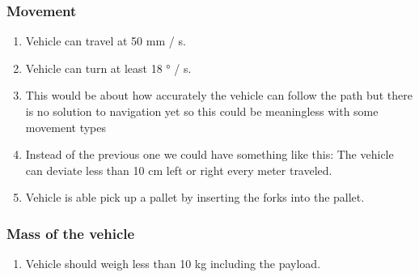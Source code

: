 \documentclass{article}
\begin{document}
        \subsubsection{Movement}
           \begin{center}
                \begin{enumerate}
                    \item Vehicle can travel at 50 mm / s.
                    \item Vehicle can turn at least 18 ° / s. %
                    \item This would be about how accurately the vehicle can follow the path but there is no solution to navigation yet so this could be meaningless with some movement types
                    \item Instead of the previous one we could have something like this: The vehicle can deviate less than 10 cm left or right every meter traveled.
                    \item Vehicle is able pick up a pallet by inserting the forks into the pallet. %
                \end{enumerate}
            \end{center}

        \subsubsection{Mass of the vehicle}
        \begin{center}
            \begin{enumerate}
                \item Vehicle should weigh less than 10 kg including the payload. %
            \end{enumerate}
        \end{center}
\end{document}

